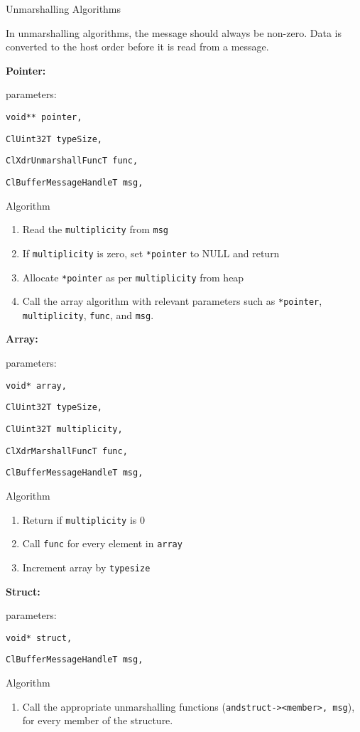 \begin{flushleft}
\begin{Desc}
\item
[Unmarshalling Algorithms]
\end{Desc}

In unmarshalling algorithms, the message should always be non-zero. Data is converted to the host order before it is read from a message.
\par
\textbf{Pointer:}\par
parameters:\par
{\tt{void** pointer,}}\par
{\tt{ClUint32T typeSize,}}\par
{\tt{ClXdrUnmarshallFuncT func,}}\par
{\tt{ClBufferMessageHandleT msg,}}\par
Algorithm
\begin{enumerate}
\item
Read the {\tt{multiplicity}} from {\tt{msg}}
\item
If {\tt{multiplicity}} is zero, set {\tt{*pointer}} to NULL and return
\item
Allocate {\tt{*pointer}} as per {\tt{multiplicity}} from heap
\item
Call the array algorithm with relevant parameters such as {\tt{*pointer}}, {\tt{multiplicity}}, {\tt{func}}, and {\tt{msg}}.
\end{enumerate}

\textbf{Array:}\par
parameters:\par
{\tt{void* array,}}\par
{\tt{ClUint32T typeSize,}}\par
{\tt{ClUint32T multiplicity,}}\par
{\tt{ClXdrMarshallFuncT func,}}\par
{\tt{ClBufferMessageHandleT msg,}}\par
Algorithm
\begin{enumerate}
\item
Return if {\tt{multiplicity}} is 0
\item
Call {\tt{func}} for every element in {\tt{array}}
\item
Increment array by {\tt{typesize}}
\end{enumerate}

\textbf{Struct:}\par
parameters:\par
{\tt{void* struct,}}\par
{\tt{ClBufferMessageHandleT msg,}}\par
Algorithm
\begin{enumerate}
\item
Call the appropriate unmarshalling functions ({\tt{andstruct-><member>, msg}}), for every member of the structure.
\end{enumerate}


\end{flushleft}
